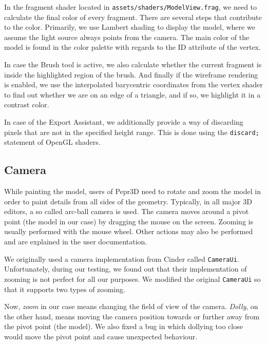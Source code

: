 In the fragment shader located in \texttt{assets/shaders/ModelView.frag}, we need to calculate the final color of every fragment.
There are several steps that contribute to the color.
Primarily, we use Lambert shading to display the model, where we assume the light source always points from the camera.
The main color of the model is found in the color palette with regards to the ID attribute of the vertex.

In case the Brush tool is active, we also calculate whether the current fragment is inside the highlighted region of the brush.
And finally if the wireframe rendering is enabled, we use the interpolated barycentric coordinates from the vertex shader to find out whether we are on an edge of a triangle, and if so, we highlight it in a contrast color.

In case of the Export Assistant, we additionally provide a way of discarding pixels that are not in the specified height range.
This is done using the \texttt{discard;} statement of OpenGL shaders.

\subsection{Camera}

While painting the model, users of Pepr3D need to rotate and zoom the model in order to paint details from all sides of the geometry.
Typically, in all major 3D editors, a so called arc-ball camera is used.
The camera moves around a pivot point (the model in our case) by dragging the mouse on the screen.
Zooming is usually performed with the mouse wheel.
Other actions may also be performed and are explained in the user documentation.

We originally used a camera implementation from Cinder called \texttt{CameraUi}.
Unfortunately, during our testing, we found out that their implementation of zooming is not perfect for all our purposes.
We modified the original \texttt{CameraUi} so that it supports two types of zooming.

Now, \emph{zoom} in our case means changing the field of view of the camera.
\emph{Dolly}, on the other hand, means moving the camera position towards or further away from the pivot point (the model).
We also fixed a bug in which dollying too close would move the pivot point and cause unexpected behaviour.